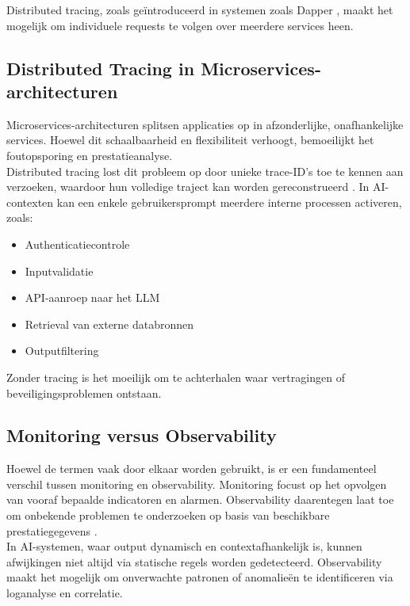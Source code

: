 Distributed tracing, zoals geïntroduceerd in systemen zoals Dapper \autocite{sigelman2010dapper}, maakt het mogelijk om individuele requests te volgen over meerdere services heen.

\subsection{Distributed Tracing in Microservices-architecturen}

Microservices-architecturen splitsen applicaties op in afzonderlijke, onafhankelijke services. Hoewel dit schaalbaarheid en flexibiliteit verhoogt, bemoeilijkt het foutopsporing en prestatieanalyse.\\

Distributed tracing lost dit probleem op door unieke trace-ID’s toe te kennen aan verzoeken, waardoor hun volledige traject kan worden gereconstrueerd \autocite{sigelman2010dapper}. In AI-contexten kan een enkele gebruikersprompt meerdere interne processen activeren, zoals:

\begin{itemize}
    \item Authenticatiecontrole
    \item Inputvalidatie
    \item API-aanroep naar het LLM
    \item Retrieval van externe databronnen
    \item Outputfiltering
\end{itemize}

Zonder tracing is het moeilijk om te achterhalen waar vertragingen of beveiligingsproblemen ontstaan.

\subsection{Monitoring versus Observability}

Hoewel de termen vaak door elkaar worden gebruikt, is er een fundamenteel verschil tussen monitoring en observability. Monitoring focust op het opvolgen van vooraf bepaalde indicatoren en alarmen. Observability daarentegen laat toe om onbekende problemen te onderzoeken op basis van beschikbare prestatiegegevens \autocite{ganesan2022observability}.\\

In AI-systemen, waar output dynamisch en contextafhankelijk is, kunnen afwijkingen niet altijd via statische regels worden gedetecteerd. Observability maakt het mogelijk om onverwachte patronen of anomalieën te identificeren via loganalyse en correlatie.

